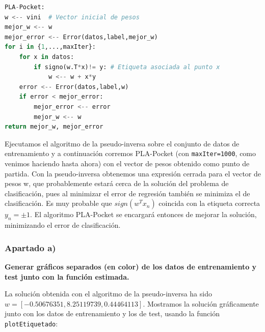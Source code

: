 \documentclass[a4]{article}
\begin{document}
\begin{lstlisting}[language=Python]
PLA-Pocket:
w <-- vini  # Vector inicial de pesos
mejor_w <-- w
mejor_error <-- Error(datos,label,mejor_w)
for i in {1,...,maxIter}:
	for x in datos:
		if signo(w.T*x)!= y: # Etiqueta asociada al punto x
			w <-- w + x*y
	error <-- Error(datos,label,w)
	if error < mejor_error:
		mejor_error <-- error
		mejor_w <-- w
return mejor_w, mejor_error

\end{lstlisting}

Ejecutamos el algoritmo de la pseudo-inversa sobre el conjunto de datos de entrenamiento y a continuación corremos PLA-Pocket (con \lstinline|maxIter=1000|, como venimos haciendo hasta ahora) con el vector de pesos obtenido como punto de partida. Con la pseudo-inversa obtenemos una expresión cerrada para el vector de pesos w, que probablemente estará cerca de la solución del problema de clasificación, pues al minimizar el error de regresión también se minimiza el de clasificación. Es muy probable que \(sign(w^Tx_n)\) coincida con la etiqueta correcta \(y_n=\pm 1\). El algoritmo PLA-Pocket se encargará entonces de mejorar la solución, minimizando el error de clasificación. 
\newpage
\subsubsection{Apartado a)}
\textbf{Generar gráficos separados (en color) de los datos de entrenamiento y test junto con
la función estimada.}

La solución obtenida con el algoritmo de la pseudo-inversa ha sido $w=[-0.50676351,  8.25119739,  0.44464113]$. Mostramos la solución gráficamente junto con los datos de entrenamiento y los de test, usando la función \lstinline|plotEtiquetado|:
\end{document}
